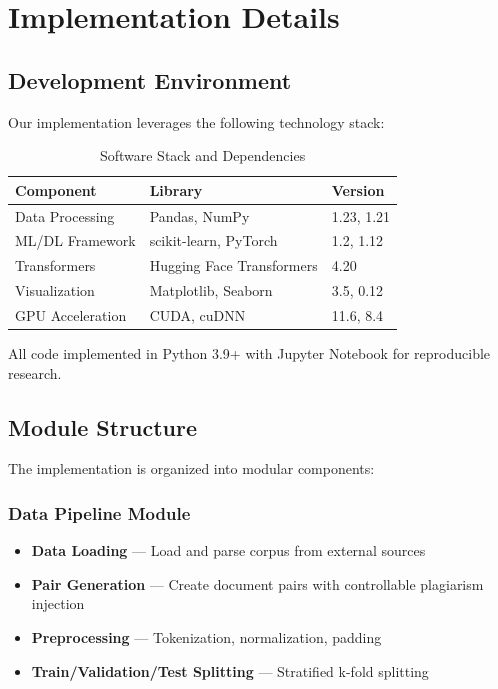 \section{Implementation Details} \label{sec:implementation}

\subsection{Development Environment}

Our implementation leverages the following technology stack:

\begin{table}[h!]
\centering
\caption{Software Stack and Dependencies}
\label{tab:stack}
\begin{tabular}{|l|l|l|}
\hline
\textbf{Component} & \textbf{Library} & \textbf{Version} \\
\hline
Data Processing & Pandas, NumPy & 1.23, 1.21 \\
\hline
ML/DL Framework & scikit-learn, PyTorch & 1.2, 1.12 \\
\hline
Transformers & Hugging Face Transformers & 4.20 \\
\hline
Visualization & Matplotlib, Seaborn & 3.5, 0.12 \\
\hline
GPU Acceleration & CUDA, cuDNN & 11.6, 8.4 \\
\hline
\end{tabular}
\end{table}

All code implemented in Python 3.9+ with Jupyter Notebook for reproducible research.

\subsection{Module Structure}

The implementation is organized into modular components:

\subsubsection{Data Pipeline Module}

\begin{itemize}
  \item \textbf{Data Loading} --- Load and parse corpus from external sources
  \item \textbf{Pair Generation} --- Create document pairs with controllable plagiarism injection
  \item \textbf{Preprocessing} --- Tokenization, normalization, padding
  \item \textbf{Train/Validation/Test Splitting} --- Stratified k-fold splitting
\end{itemize}

